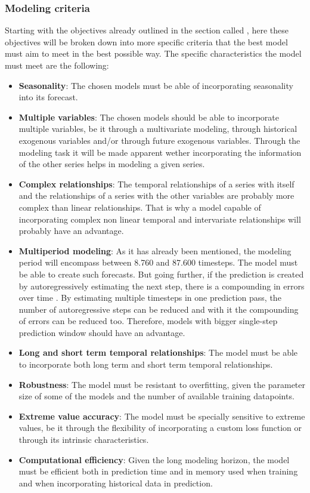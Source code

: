 \subsubsection{Modeling criteria}
Starting with the objectives already outlined in the section called , here these objectives will be broken down into more specific criteria that the best model must aim to meet in the best possible way. The specific characteristics the model must meet are the following:
\begin{itemize}
    \item \textbf{Seasonality}: The chosen models must be able of incorporating seasonality into its forecast. 
    \item \textbf{Multiple variables}: The chosen models should be able to incorporate multiple variables, be it through a multivariate modeling, through historical exogenous variables and/or through future exogenous variables. Through the modeling task it will be made apparent wether incorporating the information of the other series helps in modeling a given series.
    \item \textbf{Complex relationships}: The temporal relationships of a series with itself and the relationships of a series with the other variables are probably more complex than linear relationships. That is why a model capable of incorporating complex non linear temporal and intervariate relationships will probably have an advantage.
    \item \textbf{Multiperiod modeling}: As it has already been mentioned, the modeling period will encompass between 8.760 and 87.600 timesteps. The model must be able to create such forecasts. But going further, if the prediction is created by autoregressively estimating the next step, there is a compounding in errors over time \cite{educing_error_propagation_long}. By estimating multiple timesteps in one prediction pass, the number of autoregressive steps can be reduced and with it the compounding of errors can be reduced too. Therefore, models with bigger single-step prediction window should have an advantage.
    \item \textbf{Long and short term temporal relationships}: The model must be able to incorporate both long term and short term temporal relationships.
    \item \textbf{Robustness}: The model must be resistant to overfitting, given the parameter size of some of the models and the number of available training datapoints. 
    \item \textbf{Extreme value accuracy}: The model must be specially sensitive to extreme values, be it through the flexibility of incorporating a custom loss function or through its intrinsic characteristics.
    \item \textbf{Computational efficiency}: Given the long modeling horizon, the model must be efficient both in prediction time and in memory used when training and when incorporating historical data in prediction.
\end{itemize}
